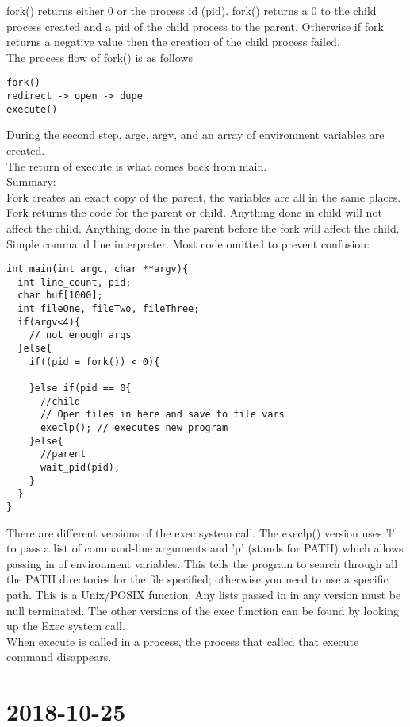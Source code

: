 \documentclass{report}
\newcommand{\mychapter}[2]{
	\setcounter{chapter}{#1}
	\setcounter{section}{0}
	\chapter*{#2}
	\addcontentsline{toc}{chapter}{#2}
}
\begin{document}
fork() returns either 0 or the process id (pid). fork() returns a 0 to the child process created and a pid of the child process to the parent. Otherwise if fork returns a negative value then the creation of the child process failed.\\

The process flow of fork() is as follows
\begin{verbatim}
fork()
redirect -> open -> dupe
execute()
\end{verbatim}

During the second step, argc, argv, and an array of environment variables are created.\\

The return of execute is what comes back from main.\\

Summary:\\
Fork creates an exact copy of the parent, the variables are all in the same places. Fork returns the code for the parent or child. Anything done in child will not affect the child. Anything done in the parent before the fork will affect the child.\\

\pagebreak
Simple command line interpreter. Most code omitted to prevent confusion:
\begin{verbatim}
int main(int argc, char **argv){
  int line_count, pid;
  char buf[1000];
  int fileOne, fileTwo, fileThree;
  if(argv<4){
  	// not enough args
  }else{
    if((pid = fork()) < 0){
  		
    }else if(pid == 0{
      //child
      // Open files in here and save to file vars
      execlp(); // executes new program
    }else{
      //parent
      wait_pid(pid);
    }
  }
}
\end{verbatim}
There are different versions of the exec system call. The execlp() version uses 'l' to pass a list of command-line arguments and 'p' (stands for PATH) which allows passing in of environment variables. This tells the program to search through all the PATH directories for the file specified; otherwise you need to use a specific path. This is a Unix/POSIX function. Any lists passed in in any version must be null terminated. The other versions of the exec function can be found by looking up the Exec system call.\\

When execute is called in a process, the process that called that execute command disappears.

\mychapter{6}{2018-10-25}
\end{document}
